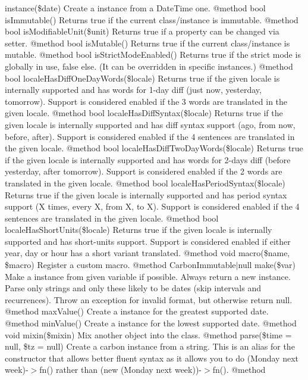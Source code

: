 \begin{DoxyRefList}
 instance(\$date) Create a  instance from a Date\+Time one. @method bool is\+Immutable() Returns true if the current class/instance is immutable. @method bool is\+Modifiable\+Unit(\$unit) Returns true if a property can be changed via setter. @method bool is\+Mutable() Returns true if the current class/instance is mutable. @method bool is\+Strict\+Mode\+Enabled() Returns true if the strict mode is globally in use, false else. (It can be overridden in specific instances.) @method bool locale\+Has\+Diff\+One\+Day\+Words(\$locale) Returns true if the given locale is internally supported and has words for 1-\/day diff (just now, yesterday, tomorrow). Support is considered enabled if the 3 words are translated in the given locale. @method bool locale\+Has\+Diff\+Syntax(\$locale) Returns true if the given locale is internally supported and has diff syntax support (ago, from now, before, after). Support is considered enabled if the 4 sentences are translated in the given locale. @method bool locale\+Has\+Diff\+Two\+Day\+Words(\$locale) Returns true if the given locale is internally supported and has words for 2-\/days diff (before yesterday, after tomorrow). Support is considered enabled if the 2 words are translated in the given locale. @method bool locale\+Has\+Period\+Syntax(\$locale) Returns true if the given locale is internally supported and has period syntax support (X times, every X, from X, to X). Support is considered enabled if the 4 sentences are translated in the given locale. @method bool locale\+Has\+Short\+Units(\$locale) Returns true if the given locale is internally supported and has short-\/units support. Support is considered enabled if either year, day or hour has a short variant translated. @method void macro(\$name, \$macro) Register a custom macro. @method Carbon\+Immutable\texorpdfstring{$\vert$}{|}null make(\$var) Make a  instance from given variable if possible. Always return a new instance. Parse only strings and only these likely to be dates (skip intervals and recurrences). Throw an exception for invalid format, but otherwise return null. @method  max\+Value() Create a  instance for the greatest supported date. @method  min\+Value() Create a  instance for the lowest supported date. @method void mixin(\$mixin) Mix another object into the class. @method  parse(\$time = null, \$tz = null) Create a carbon instance from a string. This is an alias for the constructor that allows better fluent syntax as it allows you to do (\textquotesingle{}Monday next week\textquotesingle{})-\/\texorpdfstring{$>$}{>}fn() rather than (new (\textquotesingle{}Monday next week\textquotesingle{}))-\/\texorpdfstring{$>$}{>}fn(). @method  
\end{DoxyRefList}
